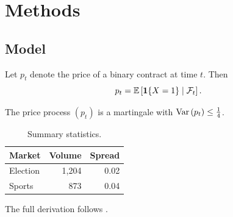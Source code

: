 \chapter{Methods}\label{ch:methods}

\section{Model}
Let $p_t$ denote the price of a binary contract at time $t$. Then
\begin{equation}\label{eq:price}
  p_t = \mathbb{E}\left[ \mathbf{1}\{X = 1\} \mid \mathcal{F}_t \right].
\end{equation}

\begin{theorem}\label{thm:martingale}
The price process $(p_t)$ is a martingale with $\operatorname{Var}\left(p_t\right) \le \tfrac14$.
\end{theorem}

\begin{table}[ht]
  \centering
  \begin{tabular}{lrr}
    \toprule
    Market & Volume & Spread \\
    \midrule
    Election & 1{,}204 & 0.02 \\
    Sports   &   873 & 0.04 \\
    \bottomrule
  \end{tabular}
  \caption{Summary statistics.}\label{tab:summary}
\end{table}

The full derivation follows \textcite{manski2006interpreting}.
